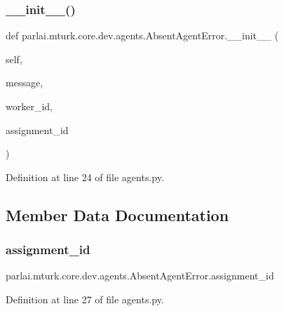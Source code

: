 \subsubsection{\texorpdfstring{\+\_\+\+\_\+init\+\_\+\+\_\+()}{\_\_init\_\_()}}
{\footnotesize\ttfamily def parlai.\+mturk.\+core.\+dev.\+agents.\+Absent\+Agent\+Error.\+\_\+\+\_\+init\+\_\+\+\_\+ (\begin{DoxyParamCaption}\item[{}]{self,  }\item[{}]{message,  }\item[{}]{worker\+\_\+id,  }\item[{}]{assignment\+\_\+id }\end{DoxyParamCaption})}



Definition at line 24 of file agents.\+py.



\subsection{Member Data Documentation}
\mbox{\label{classparlai_1_1mturk_1_1core_1_1dev_1_1agents_1_1AbsentAgentError_ab9cf020196d28024b307c41a3fff6be1}} 
\subsubsection{\texorpdfstring{assignment\+\_\+id}{assignment\_id}}
{\footnotesize\ttfamily parlai.\+mturk.\+core.\+dev.\+agents.\+Absent\+Agent\+Error.\+assignment\+\_\+id}



Definition at line 27 of file agents.\+py.



